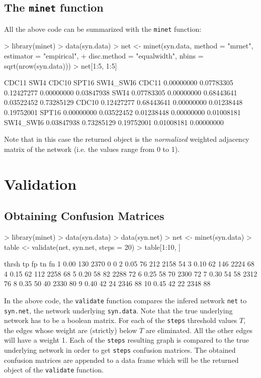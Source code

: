 \documentclass{article}
\newcommand{\Rfunction}[1]{{\texttt{#1}}}
\newcommand{\Robject}[1]{{\texttt{#1}}}
\begin{document}
\subsection{The \Rfunction{minet} function}
All the above code can be summarized with the \Rfunction{minet} function:
\begin{Schunk}
\begin{Sinput}
> library(minet)
> data(syn.data)
> net <- minet(syn.data, method = "mrnet", estimator = "empirical", 
+     disc.method = "equalwidth", nbins = sqrt(nrow(syn.data)))
> net[1:5, 1:5]
\end{Sinput}
\begin{Soutput}
               CDC11       SWI4      CDC10      SPT16  SWI4_SWI6
CDC11     0.00000000 0.07783305 0.12427277 0.00000000 0.03847938
SWI4      0.07783305 0.00000000 0.68443641 0.03522452 0.73285129
CDC10     0.12427277 0.68443641 0.00000000 0.01238448 0.19752001
SPT16     0.00000000 0.03522452 0.01238448 0.00000000 0.01008181
SWI4_SWI6 0.03847938 0.73285129 0.19752001 0.01008181 0.00000000
\end{Soutput}
\end{Schunk}
Note that in this case the returned object is the \emph{normalized} weighted adjacency matrix of the network (i.e. the values range from 0 to 1).

\section{Validation}
\subsection{Obtaining Confusion Matrices}
\begin{Schunk}
\begin{Sinput}
> library(minet)
> data(syn.data)
> data(syn.net)
> net <- minet(syn.data)
> table <- validate(net, syn.net, steps = 20)
> table[1:10, ]
\end{Sinput}
\begin{Soutput}
   thrsh  tp   fp   tn fn
1   0.00 130 2370    0  0
2   0.05  76  212 2158 54
3   0.10  62  146 2224 68
4   0.15  62  112 2258 68
5   0.20  58   82 2288 72
6   0.25  58   70 2300 72
7   0.30  54   58 2312 76
8   0.35  50   40 2330 80
9   0.40  42   24 2346 88
10  0.45  42   22 2348 88
\end{Soutput}
\end{Schunk}
In the above code, the { \Rfunction{validate}} function compares the infered network { \Robject{net}} to 
{\Robject{syn.net}}, the network underlying { \Robject{syn.data}}. Note that the true underlying network has to
be a boolean matrix. For each of the \Robject{steps} threshold values $T$, the edges whose weight are (strictly) 
below $T$ are eliminated. All the other edges will have a weight 1. Each of the \Robject{steps} resulting graph is compared to the 
true underlying network in order to get \Robject{steps} confusion matrices. The obtained confusion
matrices are appended to a data frame which will be the returned object of the \Rfunction{validate} function.
\end{document}
